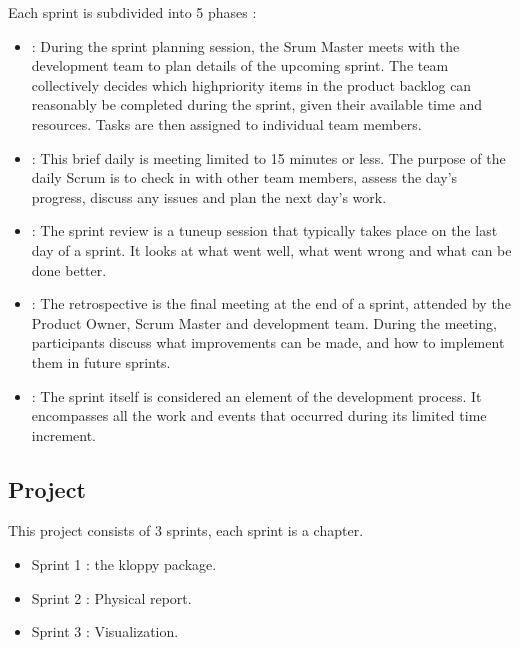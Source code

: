 \documentclass[letterpaper,10pt,english]{jupyterBook}
\begin{document}
\sphinxAtStartPar
Each sprint is subdivided into 5 phases :
\begin{itemize}
\item {} 
\sphinxAtStartPar
{}: During the sprint planning session, the Srum Master meets with the development team to plan details of the upcoming sprint. The team collectively decides which high\sphinxhyphen{}priority items in the product backlog can reasonably be completed during the sprint, given their available time and resources. Tasks are then assigned to individual team members.

\item {} 
\sphinxAtStartPar
{}: This brief daily is meeting limited to 15 minutes or less. The purpose of the daily Scrum is to check in with other team members, assess the day’s progress, discuss any issues and plan the next day’s work.

\item {} 
\sphinxAtStartPar
{}: The sprint review is a tune\sphinxhyphen{}up session that typically takes place on the last day of a sprint. It looks at what went well, what went wrong and what can be done better.

\item {} 
\sphinxAtStartPar
{}: The retrospective is the final meeting at the end of a sprint, attended by the Product Owner, Scrum Master and development team. During the meeting, participants discuss what improvements can be made, and how to implement them in future sprints.

\item {} 
\sphinxAtStartPar
{}: The sprint itself is considered an element of the development process. It encompasses all the work and events that occurred during its limited time increment.

\end{itemize}


\subsection{Project}
\label{\detokenize{Introduction/introduction:project}}
\sphinxAtStartPar
This project consists of 3 sprints, each sprint is a chapter.
\begin{itemize}
\item {} 
\sphinxAtStartPar
Sprint 1 : the kloppy package.

\item {} 
\sphinxAtStartPar
Sprint 2 : Physical report.

\item {} 
\sphinxAtStartPar
Sprint 3 : Visualization.

\end{itemize}
\end{document}
